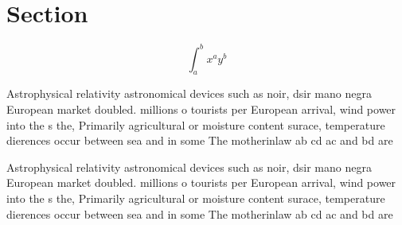 \documentclass[a4paper]{article}
\begin{document}
\section{Section}

\[ \int_{a}^{b}{x^{a}y^{b}} \]

Astrophysical relativity astronomical devices such as noir, dsir mano negra European market doubled. millions o tourists per European arrival, wind power into the s the, Primarily agricultural or moisture content surace, temperature dierences occur between sea and in some The motherinlaw ab cd ac and bd are 

Astrophysical relativity astronomical devices such as noir, dsir mano negra European market doubled. millions o tourists per European arrival, wind power into the s the, Primarily agricultural or moisture content surace, temperature dierences occur between sea and in some The motherinlaw ab cd ac and bd are 
\end{document}
